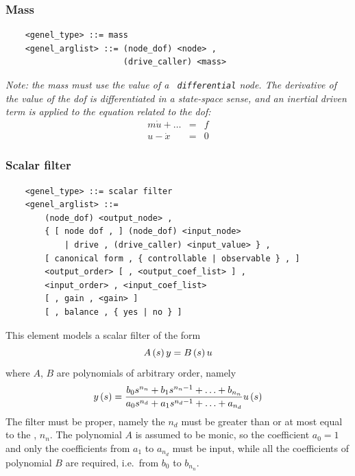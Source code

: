\subsubsection{Mass}
\label{sec:EL:GENEL:MASS}
\begin{verbatim}
    <genel_type> ::= mass
    <genel_arglist> ::= (node_dof) <node> ,                     
                        (drive_caller) <mass>
\end{verbatim}
{\em
    Note: the mass must use the  value of a {\tt
    differential} node. The derivative of the  value of
    the dof is differentiated in a state-space sense, and an inertial driven
    term is applied to the equation related to the dof:
    \begin{eqnarray*}
        m\dot{u} + \ldots & = & f \\
	u - \dot{x} & = & 0
    \end{eqnarray*}
}

\subsubsection{Scalar filter}
\label{sec:EL:GENEL:SCALAR-FILTER}
\begin{verbatim}
    <genel_type> ::= scalar filter
    <genel_arglist> ::=
        (node_dof) <output_node> ,
        { [ node dof , ] (node_dof) <input_node>
            | drive , (drive_caller) <input_value> } ,
        [ canonical form , { controllable | observable } , ]
        <output_order> [ , <output_coef_list> ] ,
        <input_order> , <input_coef_list>
        [ , gain , <gain> ]
        [ , balance , { yes | no } ]
\end{verbatim}
This element models a scalar filter of the form
\begin{displaymath}
    A\left( s \right)y = B\left( s \right)u
\end{displaymath}
where $ A $, $ B $ are polynomials of arbitrary order, namely
\begin{displaymath}
	y\left( s \right) = \frac{
		b_0 s^{n_n}
		+ b_1 s^{n_n-1}
		+ \ldots
		+ b_{n_n}
	}{
		a_0 s^{n_d}
		+ a_1 s^{n_d-1}
		+ \ldots
		+ a_{n_d}
	} u\left( s \right)
\end{displaymath}
The filter must be proper, namely the  $n_d$
must be greater than or at most equal to the , $n_n$.
The polynomial $ A $ is assumed to be monic, so the coefficient 
$a_0=1$ and only the coefficients from $a_1$ to $a_{n_d}$ must be input,
while all the coefficients of polynomial $ B $ are required,
i.e.\ from $b_0$ to $b_{n_n}$.

